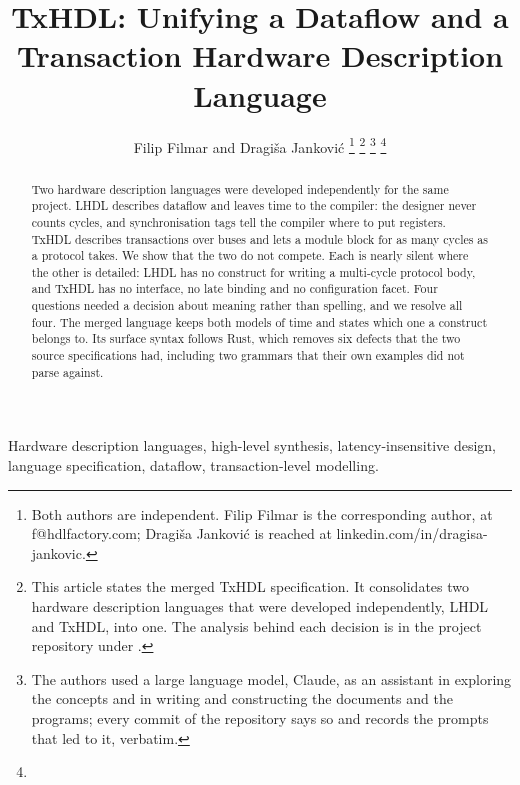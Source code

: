 \documentclass[journal,9pt]{IEEEtran}
\title{TxHDL: Unifying a Dataflow and a Transaction Hardware Description
Language}
\author{Filip Filmar and Dragiša Janković%
\thanks{Both authors are independent. Filip Filmar is the
corresponding author, at f@hdlfactory.com; Dragiša Janković is
reached at linkedin.com/in/dragisa-jankovic.}%
\thanks{This article states the merged TxHDL specification. It consolidates
two hardware description languages that were developed independently, LHDL
and TxHDL, into one. The analysis behind each decision is in the project
repository under \code{docs/}.}%
\thanks{The authors used a large language model, Claude, as an
assistant in exploring the concepts and in writing and constructing
the documents and the programs; every commit of the repository says
so and records the prompts that led to it, verbatim.}%
\thanks{\buildstamp}}
\begin{document}
\maketitle

\begin{abstract}
Two hardware description languages were developed independently for the same
project. LHDL describes dataflow and leaves time to the compiler: the
designer never counts cycles, and synchronisation tags tell the compiler
where to put registers. TxHDL describes transactions over buses and lets a
module block for as many cycles as a protocol takes. We show that the two do
not compete. Each is nearly silent where the other is detailed: LHDL has no
construct for writing a multi-cycle protocol body, and TxHDL has no
interface, no late binding and no configuration facet. Four questions needed
a decision about meaning rather than spelling, and we resolve all four. The
merged language keeps both models of time and states which one a construct
belongs to. Its surface syntax follows Rust, which removes six defects that
the two source specifications had, including two grammars that their own
examples did not parse against.
\end{abstract}

\begin{IEEEkeywords}
Hardware description languages, high-level synthesis, latency-insensitive
design, language specification, dataflow, transaction-level modelling.
\end{IEEEkeywords}

{\footnotesize\tableofcontents}











\end{document}
